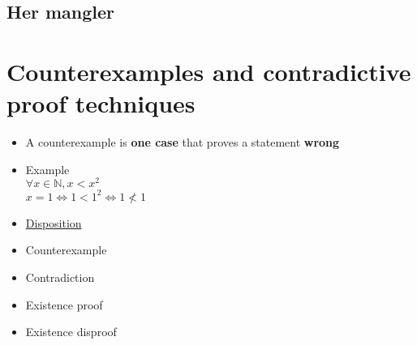 \documentclass[english,10pt,a4paper]{article}
\begin{document}
\subsection{Her mangler}



\newpage
\section{Counterexamples and contradictive proof techniques}

\begin{minipage}{0.7\linewidth}
\begin{theo}[Counterexample] 
\begin{itemize}
\item A counterexample is \textbf{one case} that proves a statement \textbf{wrong}
\item Example
\\
$\forall x \in \mathbb{N}, x < x^2$ \\
$x=1 \Leftrightarrow 1 < 1^2 \Leftrightarrow 1 \not < 1$
\end{itemize}
\end{theo}
\end{minipage}
\hspace{0.1cm}
\begin{minipage}{0.25\linewidth}
\begin{itemize}
\item[] \underline{Disposition} 
\item Counterexample
\item Contradiction
\item Existence proof
\item Existence disproof
\end{itemize}
\end{minipage}
\end{document}
